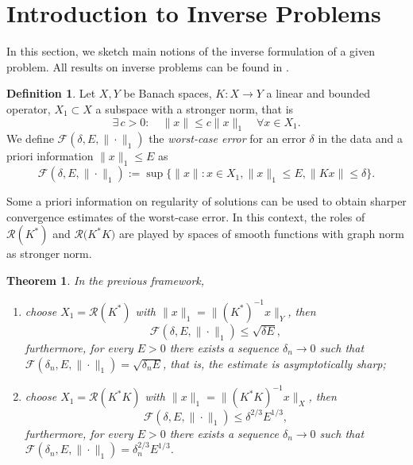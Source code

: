 \documentclass[10pt, a4paper, twoside, openright]{book}
\theoremstyle{definition}
\newtheorem{definition}[subsection]{Definition}
\theoremstyle{plain}
\newtheorem{theorem}[subsection]{Theorem}
\theoremstyle{plain}
\theoremstyle{plain}
\theoremstyle{plain}
\theoremstyle{plain}
\theoremstyle{plain}
\theoremstyle{plain}
\theoremstyle{plain}
\begin{document}
\section{Introduction to Inverse Problems}
In this section, we sketch main notions of the inverse formulation of a given problem. All results 
on inverse problems can be found in \cite{kirsch:book}.
\begin{definition}
 Let $X,Y$ be Banach spaces, $K:X\to Y$ a linear and bounded operator, $X_1\subset X$ a subspace with a stronger norm, that is
 \begin{equation}
  \exists \, c>0:\quad \|x\|\leq c\|x\|_1\quad\forall x\in X_1.
 \end{equation}
 We define $\mathcal{F}(\delta, E, \|\cdot\|_1)$ the \emph{worst-case error} for an error $\delta$ in the data and a priori information $\|x\|_1\leq E$ as
 \begin{equation}
  \mathcal{F}(\delta, E, \|\cdot\|_1):= \sup\Big\{\|x\|:x\in X_1, \|x\|_1 \leq E, \|Kx\|\leq\delta\Big\}.
 \end{equation}
\end{definition}
Some a priori information on regularity of solutions can be used to obtain sharper convergence estimates of the worst-case error. 
In this context, the roles of $\mathcal{R}(K^*)$ and $\mathcal{R}({K^*K)}$ are played by spaces of smooth functions with graph norm as stronger norm.
\begin{theorem}
 In the previous framework,
 \begin{enumerate}
  \item choose $X_1=\mathcal{R}(K^*)$ with $\|x\|_1=\|(K^*)^{-1}x\|_Y$, then
  \begin{equation}
   \mathcal{F}(\delta, E, \|\cdot\|_1)\leq \sqrt{\delta E},
  \end{equation}
  furthermore, for every $E>0$ there exists a sequence $\delta_n\to 0$ such that $\mathcal{F}(\delta_n, E, \|\cdot\|_1) = \sqrt{\delta_n E}$, that is, the estimate is asymptotically sharp;
  \item choose $X_1=\mathcal{R}(K^*K)$ with $\|x\|_1=\|(K^*K)^{-1}x\|_X$, then
  \begin{equation}
   \mathcal{F}(\delta, E, \|\cdot\|_1)\leq \delta^{2/3} E^{1/3},
  \end{equation}
  furthermore, for every $E>0$ there exists a sequence $\delta_n\to 0$ such that $\mathcal{F}(\delta_n, E, \|\cdot\|_1) = \delta_n^{2/3} E^{1/3}$.
 \end{enumerate}
\end{theorem}
\end{document}
